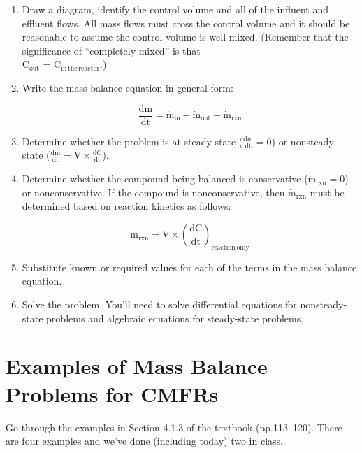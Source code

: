 \documentclass[12pt,letterpaper]{article}
\begin{document}
\begin{enumerate}
\item Draw a diagram, identify the control volume and all of the influent and effluent flows.  All mass flows must cross the control volume and it should be reasonable to assume the control volume is well mixed.  (Remember that the significance of ``completely mixed'' is that\\ C$_{\mathrm{out}}$ = C$_{\mathrm{in\, the\, reactor}}$.)
\item Write the mass balance equation in general form:

\begin{equation*}
\mathrm{\frac{dm}{dt} = \dot{m}_{in} - \dot{m}_{out} + \dot{m}_{rxn}}
\end{equation*}

\item Determine whether the problem is at steady state ($\mathrm{\frac{dm}{dt} = 0}$) or nonsteady state ($\mathrm{\frac{dm}{dt} = V\times \frac{dC}{dt}}$).
\item Determine whether the compound being balanced is conservative ($\mathrm{\dot{m}_{rxn} = 0}$) or nonconservative.  If the compound is nonconservative, then $\mathrm{\dot{m}_{rxn}}$ must be determined based on reaction kinetics as follows:

\begin{equation*}
\mathrm{\dot{m}_{rxn} = V\times (\frac{dC}{dt})_{reaction\,  only}}
\end{equation*}

\item Substitute known or required values for each of the terms in the mass balance equation.

\item Solve the problem.  You'll need to solve differential equations for nonsteady-state problems and algebraic equations for steady-state problems.

\end{enumerate}

\section *{Examples of Mass Balance Problems for CMFRs}
Go through the examples in Section 4.1.3 of the textbook (pp.113--120).  There are four examples and we've done (including today) two in class.
\end{document}
